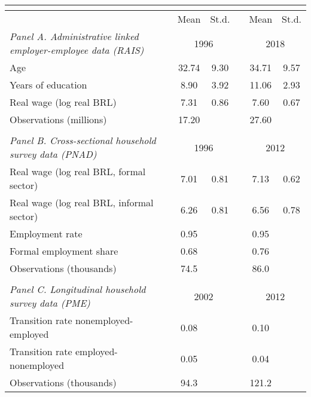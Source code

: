 \begin{tabular}{lccccc}
\multicolumn{1}{c}{} &  &  &  &  & \tabularnewline
\hline
\hline
 & Mean  & St.d. &  & Mean  & St.d. \tabularnewline
\hline
\emph{Panel A. Administrative linked employer-employee data (RAIS)} & \multicolumn{2}{c}{1996} &  & \multicolumn{2}{c}{2018}\tabularnewline
\cline{2-3} \cline{3-3} \cline{5-6} \cline{6-6}
Age  & 32.74 & 9.30 &  & 34.71  & 9.57\tabularnewline
Years of education  & 8.90 & 3.92 &  & 11.06 & 2.93\tabularnewline
Real wage (log real BRL)  & 7.31 & 0.86 &  & 7.60 & 0.67\tabularnewline
Observations (millions)  & 17.20 &  &  & 27.60 & \tabularnewline
 &  &  &  &  & \tabularnewline
\emph{Panel B. Cross-sectional household survey data (PNAD)} & \multicolumn{2}{c}{1996} &  & \multicolumn{2}{c}{2012}\tabularnewline
\cline{2-3} \cline{3-3} \cline{5-6} \cline{6-6}
Real wage (log real BRL, formal sector)  & 7.01 & 0.81  &  & 7.13  & 0.62\tabularnewline
Real wage (log real BRL, informal sector)  & 6.26  & 0.81  &  & 6.56  & 0.78\tabularnewline
Employment rate  & 0.95  &  &  & 0.95  & \tabularnewline
Formal employment share  & 0.68  &  &  & 0.76  & \tabularnewline
Observations (thousands)  & 74.5  &  &  & 86.0  & \tabularnewline
 &  &  &  &  & \tabularnewline
\emph{Panel C. Longitudinal household survey data (PME)} & \multicolumn{2}{c}{2002} &  & \multicolumn{2}{c}{2012}\tabularnewline
\cline{2-3} \cline{3-3} \cline{5-6} \cline{6-6}
Transition rate nonemployed-employed  & 0.08  &  &  & 0.10  & \tabularnewline
Transition rate employed-nonemployed  & 0.05  &  &  & 0.04  & \tabularnewline
Observations (thousands)  & 94.3  &  &  & 121.2  & \tabularnewline
\hline
\end{tabular}
